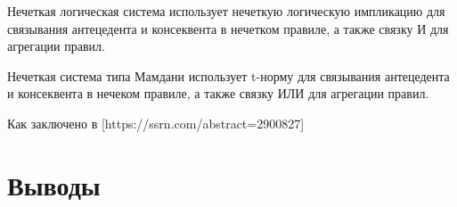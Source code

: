 Нечеткая логическая система использует нечеткую логическую импликацию для связывания антецедента и консеквента в нечетком правиле, а также связку И для агрегации правил.

Нечеткая система типа Мамдани использует t-норму для связывания антецедента и консеквента в нечеком правиле, а также связку ИЛИ для агрегации правил.

Как заключено в [https://ssrn.com/abstract=2900827] 

\section{Выводы}

\FloatBarrier
